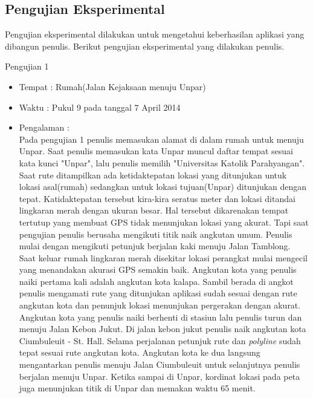 \subsection{Pengujian Eksperimental}
\label{lab:Pengujian Eksperimental}
\hspace{0.5cm} Pengujian eksperimental dilakukan untuk mengetahui keberhasilan aplikasi yang dibangun penulis. Berikut pengujian eksperimental yang dilakukan penulis.

	Pengujian 1
		\begin{itemize}
			\item Tempat : Rumah(Jalan Kejaksaan menuju Unpar)
			\item Waktu : Pukul 9 pada tanggal 7 April 2014 
			\item Pengalaman : \\
			\hspace{0.5cm} Pada pengujian 1 penulis memasukan alamat di dalam rumah untuk menuju Unpar. Saat penulis memasukan kata Unpar muncul daftar tempat sesuai kata kunci "Unpar", lalu penulis memilih "Universitas Katolik Parahyangan". Saat rute ditampilkan ada ketidaktepatan lokasi yang ditunjukan untuk lokasi asal(rumah) sedangkan untuk lokasi tujuan(Unpar) ditunjukan dengan tepat. Katidaktepatan tersebut kira-kira seratus meter dan lokasi ditandai lingkaran merah dengan ukuran besar. Hal tersebut dikarenakan tempat tertutup yang membuat GPS tidak menunjukan lokasi yang akurat. Tapi saat pengujian penulis berusaha mengikuti titik naik angkutan umum.
			\hspace{0.5cm}Penulis mulai dengan mengikuti petunjuk berjalan kaki menuju Jalan Tamblong. Saat keluar rumah lingkaran merah disekitar lokasi perangkat mulai mengecil yang menandakan akurasi GPS semakin baik. Angkutan kota yang penulis naiki pertama kali adalah angkutan kota kalapa. Sambil berada di angkot penulis mengamati rute yang ditunjukan aplikasi sudah sesuai dengan rute angkutan kota dan penunjuk lokasi menunjukan pergerakan dengan akurat. Angkutan kota yang penulis naiki berhenti di stasiun lalu penulis turun dan menuju Jalan Kebon Jukut. Di jalan kebon jukut penulis naik angkutan kota Ciumbuleuit - St. Hall. Selama perjalanan petunjuk rute dan \textit{polyline} sudah tepat sesuai rute angkutan kota. Angkutan kota ke dua langsung mengantarkan penulis menuju Jalan Ciumbuleuit untuk selanjutnya penulis berjalan menuju Unpar. Ketika sampai di Unpar, kordinat lokasi pada peta juga menunjukan titik di Unpar dan memakan waktu 65 menit.

\end{itemize}
